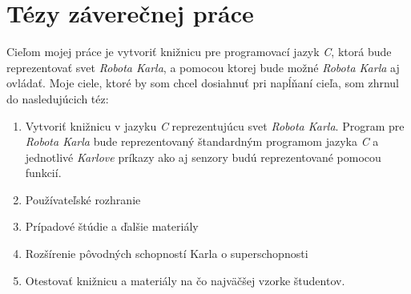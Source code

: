 
\chapter{Tézy záverečnej práce}
\label{mythesis}

Cieľom mojej práce je vytvoriť knižnicu pre programovací jazyk \emph{C}, ktorá bude reprezentovať svet \emph{Robota Karla}, a pomocou ktorej bude možné \emph{Robota Karla} aj ovládať. Moje ciele, ktoré by som chcel dosiahnuť pri napĺňaní cieľa, som zhrnul do nasledujúcich téz:

\begin{enumerate}
    \item Vytvoriť knižnicu v jazyku \emph{C} reprezentujúcu svet \emph{Robota Karla}. Program pre \emph{Robota Karla} bude reprezentovaný štandardným programom jazyka \emph{C} a jednotlivé \emph{Karlove} príkazy ako aj senzory budú reprezentované pomocou funkcií.

    \item Používateľské rozhranie

    \item Prípadové štúdie a ďalšie materiály

    \item Rozšírenie pôvodných schopností Karla o superschopnosti

    \item Otestovať knižnicu a materiály na čo najväčšej vzorke študentov.
\end{enumerate}
